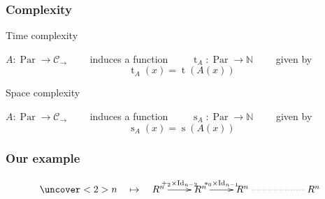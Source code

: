 \documentclass[10pt]{beamer}
\newcommand{\cat}[1]{\mathscr{#1}}
\newcommand{\C}{\cat{C}}
\DeclareMathOperator{\Id}{Id}
\newcommand{\N}{\mathbb{N}}
\newcommand{\ra}{\rightarrow}
\DeclareMathOperator{\Time}{t}
\DeclareMathOperator{\Space}{s}
\DeclareMathOperator{\Par}{Par}
\begin{document}
\begin{frame}
  \frametitle{Complexity}

  \begin{block}{Time complexity}
    \begin{center}
      $A:\Par\ra\C_\ra\qquad$ induces a function
      $\qquad\Time_A:\Par\ra\N\qquad$ given by
      \[\Time_A(x) = \Time(A(x))\]
    \end{center}
  \end{block}

  \begin{block}{Space complexity}
    \begin{center}
      $A:\Par\ra\C_\ra\qquad$ induces a function
      $\qquad\Space_A:\Par\ra\N\qquad$ given by
      \[\Space_A(x) = \Space(A(x))\]
    \end{center}
  \end{block}
\end{frame}



\begin{frame}[fragile]
  \frametitle{Our example}

  \begin{center}
    \begin{minipage}{0.7\textwidth}
\begin{semiverbatim}
\end{semiverbatim}
    \end{minipage}
  \end{center}

  \vfill

  \begin{center}
    \[\uncover<2>{n \quad\mapsto\quad}\xymatrix{
      R^n\ar[r]^{+_2\times{\Id_{n-2}}} & R^n\ar[r]^{*_0\times{\Id_{n-1}}} &
      R^{n} \ar@{.}[rr] && R^n
    }\]
  \end{center}
\end{frame}
\end{document}
